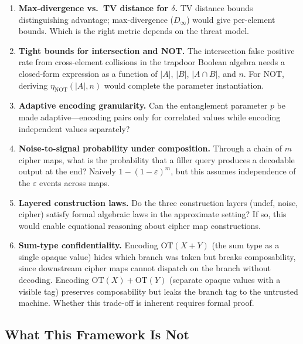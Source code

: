 \documentclass[11pt]{article}
\theoremstyle{definition}
\theoremstyle{plain}
\theoremstyle{remark}
\begin{document}
\begin{enumerate}
\item \textbf{Max-divergence vs.\ TV distance for $\delta$.}
    TV distance bounds distinguishing advantage; max-divergence
    ($D_\infty$) would give per-element bounds.  Which is the right metric
    depends on the threat model.

\item \textbf{Tight bounds for intersection and NOT.}
    The intersection false positive rate from cross-element collisions in
    the trapdoor Boolean algebra needs a closed-form expression as a
    function of $|A|$, $|B|$, $|A \cap B|$, and $n$.  For NOT, deriving
    $\eta_{\mathrm{NOT}}(|A|, n)$ would complete the parameter instantiation.

\item \textbf{Adaptive encoding granularity.}
    Can the entanglement parameter $p$ be made adaptive---encoding pairs
    only for correlated values while encoding independent values
    separately?

\item \textbf{Noise-to-signal probability under composition.}
    Through a chain of $m$ cipher maps, what is the probability that a
    filler query produces a decodable output at the end?  Naively
    $1 - (1-\varepsilon)^m$, but this assumes independence of the
    $\varepsilon$ events across maps.

\item \textbf{Layered construction laws.}
    Do the three construction layers (undef, noise, cipher) satisfy formal
    algebraic laws in the approximate setting?  If so, this would enable
    equational reasoning about cipher map constructions.

\item \textbf{Sum-type confidentiality.}
    Encoding $\mathrm{OT}(X+Y)$ (the sum type as a single opaque value) hides
    which branch was taken but breaks composability, since downstream cipher
    maps cannot dispatch on the branch without decoding.  Encoding
    $\mathrm{OT}(X)+\mathrm{OT}(Y)$ (separate opaque values with a visible
    tag) preserves composability but leaks the branch tag to the untrusted
    machine.  Whether this trade-off is inherent requires formal proof.
\end{enumerate}

\subsection{What This Framework Is Not}
\end{document}
